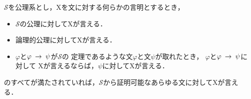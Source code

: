 	
	\begin{screen}
		\begin{metaaxm}[証明に対する構造的帰納法]
			$\mathscr{S}$を公理系とし，Xを文に対する何らかの言明とするとき，
			\begin{itemize}
				\item $\mathscr{S}$の公理に対してXが言える．
				\item 論理的公理に対してXが言える．
				\item $\varphi$と$\varphi \hspace{0.25em}\rightarrow\hspace{0.25em} \psi$が$\mathscr{S}$の
					定理であるような文$\varphi$と文$\psi$が取れたとき，
					$\varphi$と$\varphi \hspace{0.25em}\rightarrow\hspace{0.25em} \psi$に対して
					Xが言えるならば，$\psi$に対してXが言える．
			\end{itemize}
			のすべてが満たされていれば，$\mathscr{S}$から証明可能なあらゆる文に対してXが言える．
		\end{metaaxm}
	\end{screen}
	
